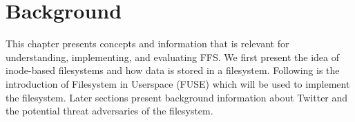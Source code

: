 \chapter{Background}

\label{ch:background}






This chapter presents concepts and information that is relevant for understanding, implementing, and evaluating FFS. We first present the idea of inode-based filesystems and how data is stored in a filesystem. Following is the introduction of Filesystem in Userspace (FUSE) which will be used to implement the filesystem. Later sections present background information about Twitter and the potential threat adversaries of the filesystem. 









